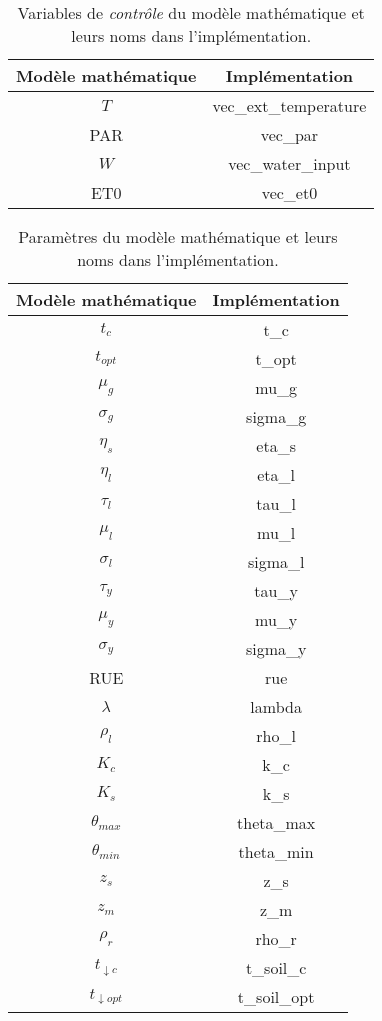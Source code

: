 \begin{table}
  \centering
  \begin{tabular}{|c|c|}
    \hline
    \textbf{Modèle mathématique} & \textbf{Implémentation} \\
    \hline
    $T$ & vec\_ext\_temperature \\
    PAR & vec\_par \\
    $W$ & vec\_water\_input \\
    ET0 & vec\_et0 \\
    \hline
    \end{tabular}
  \caption{Variables de \emph{contrôle} du modèle mathématique et leurs noms
  dans l'implémentation.}
  \label{table:control_var}
\end{table}

\begin{table}
  \centering
  \begin{tabular}{|c|c|}
    \hline
    \textbf{Modèle mathématique} & \textbf{Implémentation} \\
    \hline
    $t_c$ & t\_c \\
    $t_{opt}$ & t\_opt \\
    $\mu_g$ & mu\_g \\
    $\sigma_g$ & sigma\_g \\
    $\eta_s$ & eta\_s \\
    $\eta_l$ & eta\_l \\
    $\tau_l$ & tau\_l \\
    $\mu_l$ & mu\_l \\
    $\sigma_l$ & sigma\_l \\
    $\tau_y$ & tau\_y \\
    $\mu_y$ & mu\_y \\
    $\sigma_y$ & sigma\_y \\
    RUE & rue \\
    $\lambda$ & lambda \\
    $\rho_l$ & rho\_l \\
    $K_c$ & k\_c \\
    $K_s$ & k\_s \\
    $\theta_{max}$ & theta\_max \\
    $\theta_{min}$ & theta\_min \\
    $z_s$ & z\_s \\
    $z_m$ & z\_m \\
    $\rho_r$ & rho\_r \\
    $t_{\downarrow c}$ & t\_soil\_c \\
    $t_{\downarrow opt}$ & t\_soil\_opt \\
    \hline
  \end{tabular}
  \caption{Paramètres du modèle mathématique et leurs noms
  dans l'implémentation.}
  \label{table:param_var}
\end{table}
  




